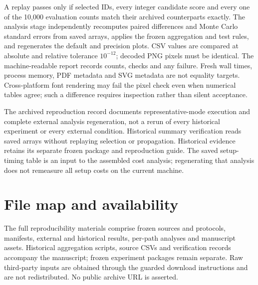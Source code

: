 \documentclass[smallextended]{svjour3}
\begin{document}
A replay passes only if selected IDs, every integer candidate score and every
one of the 10,000 evaluation counts match their archived counterparts exactly.
The analysis stage independently recomputes paired differences and Monte Carlo
standard errors from saved arrays, applies the frozen aggregation and test rules,
and regenerates the default and precision plots. CSV values are compared at
absolute and relative tolerance $10^{-12}$; decoded PNG pixels must be identical.
The machine-readable report records counts, checks and any failure. Fresh wall
times, process memory, PDF metadata and SVG metadata are not equality targets.
Cross-platform font rendering may fail the pixel check even when numerical
tables agree; such a difference requires inspection rather than silent acceptance.

The archived reproduction record documents representative-mode execution and
complete external analysis regeneration, not a rerun of every historical
experiment or every external condition. Historical summary verification reads
saved arrays without replaying selection or propagation.
Historical evidence retains its separate frozen package and reproduction guide.
The saved setup-timing table is an input to the assembled cost analysis; regenerating
that analysis does not remeasure all setup costs on the current machine.

\clearpage

\clearpage

\section{File map and availability}
The full reproducibility materials comprise frozen sources and protocols,
manifests, external and historical results, per-path analyses and manuscript
assets. Historical aggregation scripts, source CSVs and verification records
accompany the manuscript; frozen experiment packages remain separate. Raw
third-party inputs are obtained through the guarded download instructions and
are not redistributed. No public archive URL is asserted.
\end{document}
